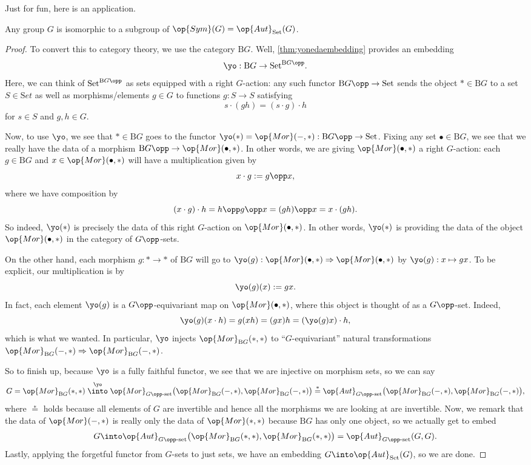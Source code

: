 Just for fun, here is an application.
\begin{corollary}
	Any group $G$ is isomorphic to a subgroup of $\op{Sym}(G)=\op{Aut}_{\mathrm{Set}}(G)$.
\end{corollary}
\begin{proof}
	To convert this to category theory, we use the category $\mathrm BG$. Well, \autoref{thm:yonedaembedding} provides an embedding
	\[\yo:\mathrm BG\to\mathrm{Set}^{\mathrm BG\opp}.\]
	Here, we can think of $\mathrm{Set}^{\mathrm BG\opp}$ as sets equipped with a right $G$-action: any such functor $\mathrm BG\opp\to\mathrm{Set}$ sends the object $*\in\mathrm BG$ to a set $S\in\mathrm Set$ as well as morphisms/elements $g\in G$ to functions $g:S\to S$ satisfying
	\[s\cdot(gh)=(s\cdot g)\cdot h\]
	for $s\in S$ and $g,h\in G$.

	Now, to use $\yo$, we see that $*\in\mathrm BG$ goes to the functor $\yo(*)=\op{Mor}(-,*):\mathrm BG\opp\to\mathrm{Set}$. Fixing any set $\bullet\in\mathrm BG$, we see that we really have the data of a morphism $\mathrm BG\opp\to\op{Mor}(\bullet,*)$. In other words, we are giving $\op{Mor}(\bullet,*)$ a right $G$-action: each $g\in\mathrm BG$ and $x\in\op{Mor}(\bullet,*)$ will have a multiplication given by
	\[x\cdot g:=g\opp x,\]
	where we have composition by
	\[(x\cdot g)\cdot h=h\opp g\opp x=(gh)\opp x=x\cdot(gh).\]
	So indeed, $\yo(*)$ is precisely the data of this right $G$-action on $\op{Mor}(\bullet,*)$. In other words, $\yo(*)$ is providing the data of the object $\op{Mor}(\bullet,*)$ in the category of $G\opp$-sets.
	
	On the other hand, each morphism $g:*\to *$ of $\mathrm BG$ will go to $\yo(g):\op{Mor}(\bullet,*)\Rightarrow\op{Mor}(\bullet,*)$ by $\yo(g):x\mapsto gx$. To be explicit, our multiplication is by
	\[\yo(g)(x):=gx.\]
	In fact, each element $\yo(g)$ is a $G\opp$-equivariant map on $\op{Mor}(\bullet,*)$, where this object is thought of as a $G\opp$-set. Indeed,
	\[\yo(g)(x\cdot h)=g(xh)=(gx)h=(\yo(g)x)\cdot h,\]
	which is what we wanted. In particular, $\yo$ injects $\op{Mor}_{\mathrm BG}(*,*)$ to ``$G$-equivariant'' natural transformations $\op{Mor}_{\mathrm BG}(-,*)\Rightarrow\op{Mor}_{\mathrm BG}(-,*)$.

	So to finish up, because $\yo$ is a fully faithful functor, we see that we are injective on morphism sets, so we can say
	\[G=\op{Mor}_{\mathrm BG}(*,*)\stackrel{\yo}\into\op{Mor}_{G\opp\text{-set}}\big(\op{Mor}_{\mathrm BG}(-,*),\op{Mor}_{\mathrm BG}(-,*)\big)\stackrel*=\op{Aut}_{G\opp\text{-set}}\big(\op{Mor}_{\mathrm BG}(-,*),\op{Mor}_{\mathrm BG}(-,*)\big),\]
	where $\stackrel*=$ holds because all elements of $G$ are invertible and hence all the morphisms we are looking at are invertible. Now, we remark that the data of $\op{Mor}(-,*)$ is really only the data of $\op{Mor}(*,*)$ because $\mathrm BG$ has only one object, so we actually get to embed
	\[G\into\op{Aut}_{G\opp\text{-set}}\big(\op{Mor}_{\mathrm BG}(*,*),\op{Mor}_{\mathrm BG}(*,*)\big)=\op{Aut}_{G\opp\text{-set}}(G,G).\]
	Lastly, applying the forgetful functor from $G$-sets to just sets, we have an embedding $G\into\op{Aut}_{\mathrm{Set}}(G)$, so we are done.
\end{proof}